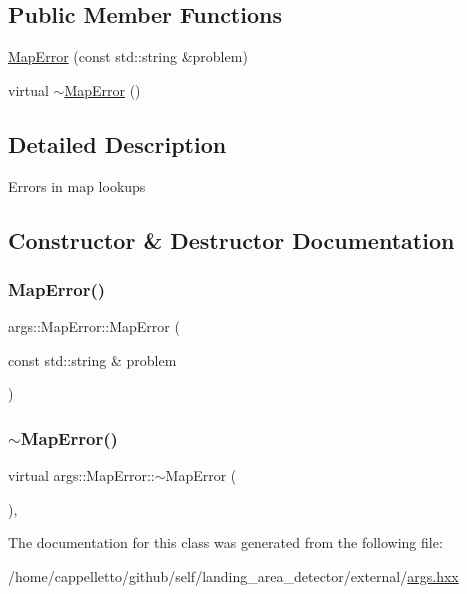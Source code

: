 \subsection*{Public Member Functions}
\begin{DoxyCompactItemize}
\item 
\hyperlink{classargs_1_1_map_error_a5339dca0b3910dd978152b442adf9de4}{Map\+Error} (const std\+::string \&problem)
\item 
virtual \hyperlink{classargs_1_1_map_error_aa5d2acb7ec907a7aa85d52a346074125}{$\sim$\+Map\+Error} ()
\end{DoxyCompactItemize}


\subsection{Detailed Description}
Errors in map lookups 

\subsection{Constructor \& Destructor Documentation}
\mbox{\label{classargs_1_1_map_error_a5339dca0b3910dd978152b442adf9de4}} 
\subsubsection{\texorpdfstring{Map\+Error()}{MapError()}}
{\footnotesize\ttfamily args\+::\+Map\+Error\+::\+Map\+Error (\begin{DoxyParamCaption}\item[{const std\+::string \&}]{problem }\end{DoxyParamCaption})\hspace{0.3cm}{\ttfamily [inline]}}

\mbox{\label{classargs_1_1_map_error_aa5d2acb7ec907a7aa85d52a346074125}} 
\subsubsection{\texorpdfstring{$\sim$\+Map\+Error()}{~MapError()}}
{\footnotesize\ttfamily virtual args\+::\+Map\+Error\+::$\sim$\+Map\+Error (\begin{DoxyParamCaption}{ }\end{DoxyParamCaption})\hspace{0.3cm}{\ttfamily [inline]}, {\ttfamily [virtual]}}



The documentation for this class was generated from the following file\+:\begin{DoxyCompactItemize}
\item 
/home/cappelletto/github/self/landing\+\_\+area\+\_\+detector/external/\hyperlink{args_8hxx}{args.\+hxx}\end{DoxyCompactItemize}
